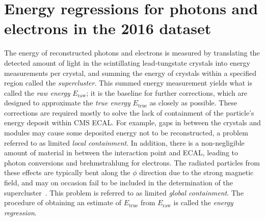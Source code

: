 \clearpage
\section{Energy regressions for photons and electrons in the 2016 dataset}
\label{app:regression}

\newcommand{\Eraw}{\ensuremath{E_\text{raw}}\xspace}
\newcommand{\Etrue}{\ensuremath{E_\text{true}}\xspace}
\newcommand{\Ecorr}{\ensuremath{E_\text{corr}}\xspace}

The energy of reconstructed photons and electrons is measured by translating the detected amount of light in the scintillating lead-tungstate crystals into energy measurements per crystal, and summing the energy of crystals within a specified region called the \textit{supercluster}.
% 
This summed energy measurement yields what is called the \textit{raw energy} $\Eraw$; it is the baseline for further corrections, which are designed to approximate the \textit{true energy} $\Etrue$ as closely as possible.
% 
These corrections are required mostly to solve the lack of containment of the particle's energy deposit within CMS ECAL.
% 
For example, gaps in between the crystals and modules may cause some deposited energy not to be reconstructed, a problem referred to as limited \textit{local containment}.
% 
In addition, there is a non-negligible amount of material in between the interaction point and ECAL, leading to photon conversions and brehmstrahlung for electrons.
% 
The radiated particles from these effects are typically bent along the $\phi$ direction due to the strong magnetic field, and may on occasion fail to be included in the determination of the supercluster~\cite{Chatrchyan:2013dga}.
% 
This problem is referred to as limited \textit{global containment}.
% 
The procedure of obtaining an estimate of $\Etrue$ from $\Eraw$ is called the \textit{energy regression}.


